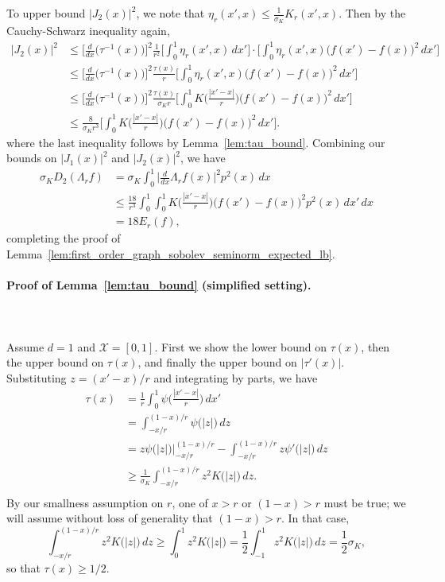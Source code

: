\documentclass{article}
\newcommand{\abs}[1]{\left \lvert #1 \right \rvert}
\newcommand{\1}{\mathbf{1}}
\newcommand{\Xset}{\mathcal{X}}
\theoremstyle{alden}
\theoremstyle{aldenthm}
\theoremstyle{definition}
\theoremstyle{remark}
\begin{document}
To upper bound $\bigl|J_2(x)\bigr|^2$, we note that $\eta_r(x',x) \leq \frac{1}{\sigma_K} K_r(x',x)$. Then by the Cauchy-Schwarz inequality again,
\begin{align*}
\bigl|J_2(x)\bigr|^2 & \leq \biggl[\frac{d}{dx}\bigl(\tau^{-1}(x)\bigr)\biggr]^2\frac{1}{r^2} \biggl[\int_{0}^1\eta_r(x',x) \,dx'\biggr] \cdot \biggl[\int_{0}^{1} \eta_r(x',x)\bigl(f(x') - f(x)\bigr)^2 \,dx' \biggr] \\
& \leq \biggl[\frac{d}{dx}\bigl(\tau^{-1}(x)\bigr)\biggr]^2\frac{\tau(x)}{r}\biggl[\int_{0}^{1} \eta_r(x',x)\bigl(f(x') - f(x)\bigr)^2 \,dx' \biggr]\\ 
& \leq \biggl[\frac{d}{dx}\bigl(\tau^{-1}(x)\bigr)\biggr]^2\frac{\tau(x)}{\sigma_K r}\biggl[\int_{0}^{1} K\biggl(\frac{|x' - x|}{r}\biggr)\bigl(f(x') - f(x)\bigr)^2 \,dx' \biggr] \\
& \leq \frac{8}{\sigma_Kr^3} \biggl[\int_{0}^{1} K\biggl(\frac{|x' - x|}{r}\biggr)\bigl(f(x') - f(x)\bigr)^2 \,dx' \biggr].
\end{align*}
where the last inequality follows by Lemma~\ref{lem:tau_bound}. Combining our bounds on $\bigl|J_1(x)\bigr|^2$ and $\bigl|J_2(x)\bigr|^2$, we have
\begin{align*}
\sigma_K D_2(\Lambda_r f) & = \sigma_K\int_{0}^{1} \biggl|\frac{d}{dx} \Lambda_rf(x)\biggr|^2 p^2(x) \,dx \\
& \leq \frac{18}{r^3} \int_{0}^{1} \int_{0}^{1} K\biggl(\frac{|x' - x|}{r}\biggr)\bigl(f(x') - f(x)\bigr)^2 p^2(x) \,dx' \,dx \\
& = 18 E_r(f),
\end{align*}
completing the proof of Lemma~\ref{lem:first_order_graph_sobolev_seminorm_expected_lb}. 
\paragraph{Proof of Lemma~\ref{lem:tau_bound} (simplified setting).} 
\mbox{} \\
\mbox{} \\
Assume $d = 1$ and $\Xset = [0,1]$. First we show the lower bound on $\tau(x)$, then the upper bound on $\tau(x)$, and finally the upper bound on $|\tau'(x)|$. Substituting $z = (x' - x)/r$ and integrating by parts, we have
\begin{align*}
\tau(x) & = \frac{1}{r} \int_{0}^{1} \psi\biggl(\frac{|x' - x|}{r}\biggr) \,dx' \\
& =  \int_{-x/r}^{(1 - x)/r}  \psi\bigl(\abs{z}\bigr) \,dz \\
& = z \psi\bigl(|z|\bigr) \bigg|_{-x/r}^{(1 - x)/r} - \int_{-x/r}^{(1 - x)/r}  z \psi'\bigl(\abs{z}\bigr) \,dz \\
& \geq \frac{1}{\sigma_K}\int_{-x/r}^{(1 - x)/r}  z^2 K\bigl(|z|\bigr) \,dz. \\
\end{align*}
By our smallness assumption on $r$, one of $x > r$ or $(1 - x) > r$ must be true; we will assume without loss of generality that $(1 - x) > r$. In that case,
\begin{equation*}
\int_{-x/r}^{(1 - x)/r}  z^2 K\bigl(|z|\bigr) \,dz \geq \int_{0}^{1} z^2K\bigl(|z|\bigr) = \frac{1}{2} \int_{-1}^{1} z^2K\bigl(|z|\bigr) \,dz = \frac{1}{2}\sigma_K,
\end{equation*}
so that $\tau(x) \geq 1/2$. 
\end{document}
